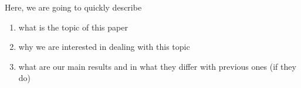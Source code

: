 Here, we are going to quickly describe
\begin{enumerate}
    \item what is the topic of this paper \cite{Luscher:2004pav}
    \item why we are interested in dealing with this topic
    \item what are our main results and in what they differ with previous ones (if they do)
\end{enumerate}